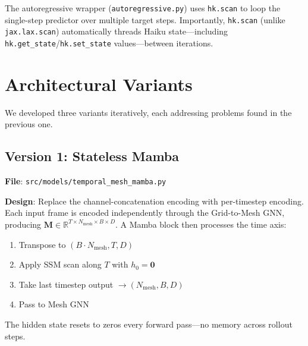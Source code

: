 \documentclass[11pt,a4paper]{article}
\begin{document}
The autoregressive wrapper (\texttt{autoregressive.py}) uses \texttt{hk.scan} to loop the single-step predictor over multiple target steps. Importantly, \texttt{hk.scan} (unlike \texttt{jax.lax.scan}) automatically threads Haiku state---including \texttt{hk.get\_state}/\texttt{hk.set\_state} values---between iterations.

\section{Architectural Variants}

We developed three variants iteratively, each addressing problems found in the previous one.

\subsection{Version 1: Stateless Mamba}

\textbf{File}: \texttt{src/models/temporal\_mesh\_mamba.py}

\textbf{Design}: Replace the channel-concatenation encoding with per-timestep encoding. Each input frame is encoded independently through the Grid-to-Mesh GNN, producing $\mathbf{M} \in \mathbb{R}^{T \times N_\text{mesh} \times B \times D}$. A Mamba block then processes the time axis:

\begin{enumerate}[nosep]
    \item Transpose to $(B \cdot N_\text{mesh}, T, D)$
    \item Apply SSM scan along $T$ with $h_0 = \mathbf{0}$
    \item Take last timestep output $\rightarrow (N_\text{mesh}, B, D)$
    \item Pass to Mesh GNN
\end{enumerate}

The hidden state resets to zeros every forward pass---no memory across rollout steps.
\end{document}
